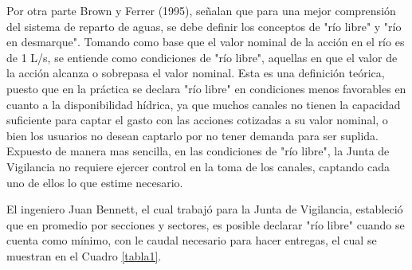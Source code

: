 \documentclass[11pt,]{article}
\begin{document}
	 Por otra parte Brown y Ferrer (1995), señalan que para una mejor comprensión del sistema de reparto de aguas, se debe definir los conceptos de "río libre" y "río en desmarque". Tomando como base que el valor nominal de la acción en el río es de 1 L/s, se entiende como condiciones de "río libre", aquellas en que el valor de la acción alcanza o sobrepasa el valor nominal. Esta es una definición teórica, puesto que en la práctica se declara "río libre" en condiciones menos favorables en cuanto a la disponibilidad hídrica, ya que muchos canales no tienen la capacidad suficiente para captar el gasto con las acciones cotizadas a su valor nominal, o bien los usuarios no desean captarlo por no tener demanda para ser suplida. Expuesto de manera mas sencilla, en las condiciones de "río libre", la Junta de Vigilancia no requiere ejercer control en la toma de los canales, captando cada uno de ellos lo que estime necesario.\bigskip

El ingeniero Juan Bennett, el cual trabajó para la Junta de Vigilancia,  estableció que en promedio por secciones y sectores, es posible declarar "río libre" cuando se cuenta como mínimo, con le caudal necesario para hacer entregas, el cual se muestran en el Cuadro \ref{tabla1}.

\begin{table}[H]
\centering
\caption{Desmarque mínimo para considerar "río Libre". (DGA, 1995)}
\label{tabla1}
\end{table}
	 
\end{document}
